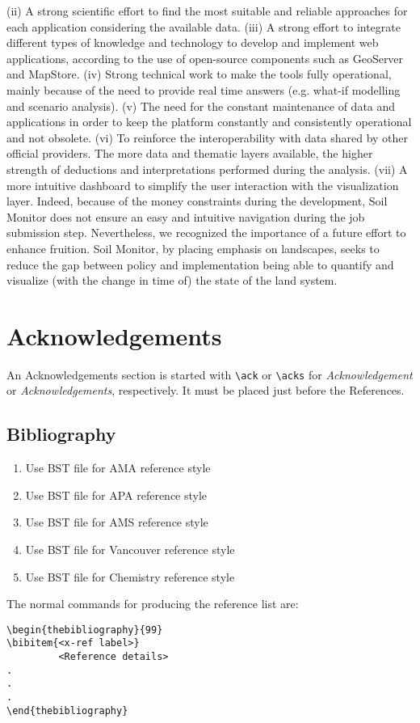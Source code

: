 \documentclass[APA,LATO1COL,doublespace]{WileyNJD-v2}
\begin{document}
(ii)	A strong scientific effort to find the most suitable and reliable approaches for each application considering the available data.
(iii)	A strong effort to integrate different types of knowledge and technology to develop and implement web applications, according to the use of open-source components such as GeoServer and MapStore.
(iv)	Strong technical work to make the tools fully operational, mainly because of the need to provide real time answers (e.g. what-if modelling and scenario analysis).
(v)	The need for the constant maintenance of data and applications in order to keep the platform constantly and consistently operational and not obsolete.
(vi)	To reinforce the interoperability with data shared by other official providers. The more data and thematic layers available, the higher strength of deductions and interpretations performed during the analysis.
(vii)	A more intuitive dashboard to simplify the user interaction with the visualization layer. Indeed, because of the money constraints during the development, Soil Monitor does not ensure an easy and intuitive navigation during the job submission step. Nevertheless, we recognized the importance of a future effort to enhance fruition.
Soil Monitor, by placing emphasis on landscapes, seeks to reduce the gap between policy and implementation being able to quantify and visualize (with the change in time of) the state of the land system.

\section{Acknowledgements}
An Acknowledgements section is started with \verb"\ack" or
\verb"\acks" for \textit{Acknowledgement} or
\textit{Acknowledgements}, respectively. It must be placed just before the References.

\subsection{Bibliography}

\begin{enumerate}[1]
\item Use \verb"" BST file for AMA reference style
\item Use \verb"" BST file for APA reference style
\item Use \verb"" BST file for AMS reference style
\item Use \verb"" BST file for Vancouver reference style
\item Use \verb"" BST file for Chemistry reference style
\end{enumerate}

The normal commands for producing the reference list are:

\begin{verbatim}
\begin{thebibliography}{99}
\bibitem{<x-ref label>}
         <Reference details>
.
.
.
\end{thebibliography}
\end{verbatim}
\end{document}
